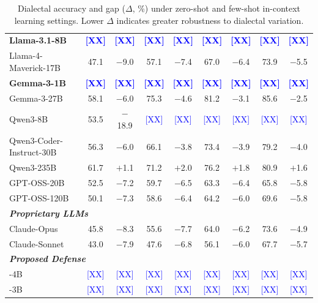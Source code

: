 \begin{table}[t]
\begin{tabular}{lcccccccc}
\textbf{Llama-3.1-8B} & \textcolor{blue}{\textbf{[XX]}} & \textcolor{blue}{\textbf{[XX]}} & \textcolor{blue}{\textbf{[XX]}} & \textcolor{blue}{\textbf{[XX]}} & \textcolor{blue}{\textbf{[XX]}} & \textcolor{blue}{\textbf{[XX]}} & \textcolor{blue}{\textbf{[XX]}} & \textcolor{blue}{\textbf{[XX]}} \\
Llama-4-Maverick-17B & 47.1 & $-$9.0 & 57.1 & $-$7.4 & 67.0 & $-$6.4 & 73.9 & $-$5.5 \\
\textbf{Gemma-3-1B} & \textcolor{blue}{\textbf{[XX]}} & \textcolor{blue}{\textbf{[XX]}} & \textcolor{blue}{\textbf{[XX]}} & \textcolor{blue}{\textbf{[XX]}} & \textcolor{blue}{\textbf{[XX]}} & \textcolor{blue}{\textbf{[XX]}} & \textcolor{blue}{\textbf{[XX]}} & \textcolor{blue}{\textbf{[XX]}} \\
Gemma-3-27B & 58.1 & $-$6.0 & 75.3 & $-$4.6 & 81.2 & $-$3.1 & 85.6 & $-$2.5 \\
Qwen3-8B & 53.5 & $-$18.9 & \textcolor{blue}{[XX]} & \textcolor{blue}{[XX]} & \textcolor{blue}{[XX]} & \textcolor{blue}{[XX]} & \textcolor{blue}{[XX]} & \textcolor{blue}{[XX]} \\
Qwen3-Coder-Instruct-30B & 56.3 & $-$6.0 & 66.1 & $-$3.8 & 73.4 & $-$3.9 & 79.2 & $-$4.0 \\
Qwen3-235B & 61.7 & $+$1.1 & 71.2 & $+$2.0 & 76.2 & $+$1.8 & 80.9 & $+$1.6 \\
GPT-OSS-20B & 52.5 & $-$7.2 & 59.7 & $-$6.5 & 63.3 & $-$6.4 & 65.8 & $-$5.8 \\
GPT-OSS-120B & 50.1 & $-$7.3 & 58.6 & $-$6.4 & 64.2 & $-$6.0 & 69.6 & $-$5.8 \\
\midrule[\lightrulewidth]
\multicolumn{9}{l}{\textbf{\textit{Proprietary LLMs}}} \\
Claude-Opus & 45.8 & $-$8.3 & 55.6 & $-$7.7 & 64.0 & $-$6.2 & 73.6 & $-$4.9 \\
Claude-Sonnet & 43.0 & $-$7.9 & 47.6 & $-$6.8 & 56.1 & $-$6.0 & 67.7 & $-$5.7 \\
\midrule
\multicolumn{9}{l}{\textbf{\textit{Proposed Defense}}} \\
\diaguard{}-4B & \textcolor{blue}{[XX]} & \textcolor{blue}{[XX]} & \textcolor{blue}{[XX]} & \textcolor{blue}{[XX]} & \textcolor{blue}{[XX]} & \textcolor{blue}{[XX]} & \textcolor{blue}{[XX]} & \textcolor{blue}{[XX]} \\
\diaguard{}-3B & \textcolor{blue}{[XX]} & \textcolor{blue}{[XX]} & \textcolor{blue}{[XX]} & \textcolor{blue}{[XX]} & \textcolor{blue}{[XX]} & \textcolor{blue}{[XX]} & \textcolor{blue}{[XX]} & \textcolor{blue}{[XX]} \\
\bottomrule
\end{tabular}
\caption{Dialectal accuracy and gap ($\Delta$, \%) under zero-shot and few-shot in-context learning settings. Lower $\Delta$ indicates greater robustness to dialectal variation.}
\label{tab:icl_results}
\end{table}